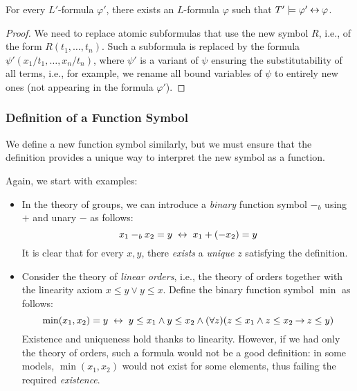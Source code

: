 \begin{proposition}
    For every $L'$-formula $\varphi'$, there exists an $L$-formula $\varphi$ such that $T'\models\varphi'\mathbin{\leftrightarrow}\varphi$.
\end{proposition}
\begin{proof}
    We need to replace atomic subformulas that use the new symbol $R$, i.e., of the form $R(t_1,\dots,t_n)$. Such a subformula is replaced by the formula $\psi'(x_1/t_1,\dots,x_n/t_n)$, where $\psi'$ is a variant of $\psi$ ensuring the substitutability of all terms, i.e., for example, we rename all bound variables of $\psi$ to entirely new ones (not appearing in the formula $\varphi'$).
\end{proof}

\subsubsection*{Definition of a Function Symbol}

We define a new function symbol similarly, but we must ensure that the definition provides a unique way to interpret the new symbol as a function.

\begin{example}
    Again, we start with examples:
    \begin{itemize}
        \item In the theory of groups, we can introduce a \emph{binary} function symbol $-_b$ using $+$ and unary $-$ as follows:
        $$
        x_1 -_b x_2 = y\ \mathbin{\leftrightarrow}\ x_1 + (-x_2) = y
        $$
        It is clear that for every $x, y$, there \emph{exists} a \emph{unique} $z$ satisfying the definition.
        \item Consider the theory of \emph{linear orders}, i.e., the theory of orders together with the linearity axiom $x\leq y\lor y\leq x$. Define the binary function symbol $\min$ as follows:
        $$
        \min(x_1,x_2)=y\ \mathbin{\leftrightarrow}\ y\leq x_1\land y\leq x_2\land (\forall z)(z\leq x_1\land z\leq x_2\mathbin{\rightarrow} z\leq y)
        $$
        Existence and uniqueness hold thanks to linearity. However, if we had only the theory of orders, such a formula would not be a good definition: in some models, $\min(x_1,x_2)$ would not exist for some elements, thus failing the required \emph{existence}.
    \end{itemize}
\end{example}

